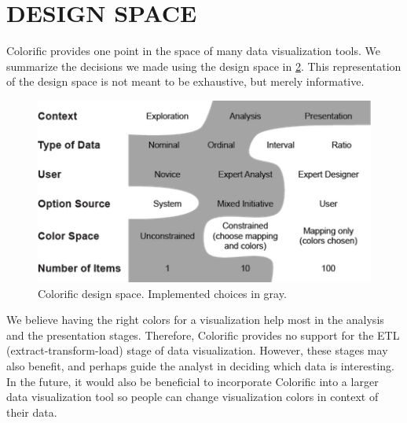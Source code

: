 \documentclass{article}
\newcommand{\system}{Colorific\xspace}
\begin{document}
\begin{figure}
\label{screenshot}
\caption{}
\end{figure}

\section{DESIGN SPACE}
\system provides one point in the space of many data visualization tools. We summarize the decisions we made using the design space in \ref{design-space}. This representation of the design space is not meant to be exhaustive, but merely informative. 

\begin{figure}
\label{design-space}
\includegraphics{design_space.png}
\caption{\system design space. Implemented choices in gray.}
\end{figure}
 We believe having the right colors for a visualization help most in the analysis and the presentation stages. Therefore, \system provides no support for the ETL (extract-transform-load) stage of data visualization. However, these stages may also benefit, and perhaps guide the analyst in deciding which data is interesting. In the future, it would also be beneficial to incorporate \system into a larger data visualization tool so people can change visualization colors in context of their data.
\end{document}
